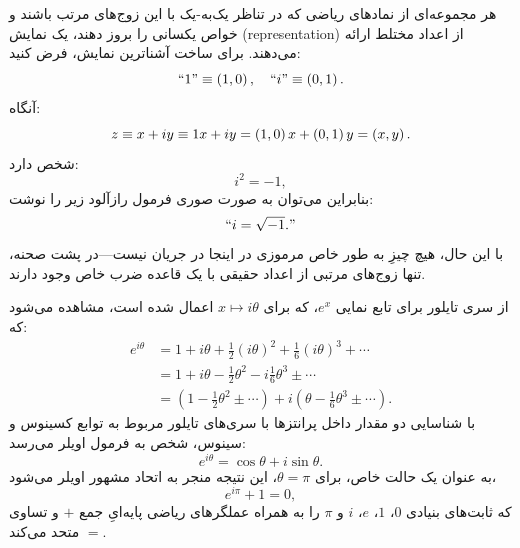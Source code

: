 \documentclass{article}
\begin{document}
هر مجموعه‌ای از نمادهای ریاضی که در تناظر یک‌به-یک با این زوج‌های مرتب باشند و خواص یکسانی را بروز دهند، یک نمایش (representation) از اعداد مختلط ارائه می‌دهند. برای ساخت آشناترین نمایش، فرض کنید:
\begin{equation}
``1"\equiv\left(1,0\right),\quad``i"\equiv\left(0,1\right).\label{eq:Def1AndiForSimpleRepresentationComplexNumbers}
\end{equation}
 آنگاه:
\begin{equation}
z\equiv x+iy\equiv1x+iy=\left(1,0\right)x+\left(0,1\right)y=\left(x,y\right).\label{eq:DefGeneralComplexNumberFromOrderedPairs}
\end{equation}
 شخص دارد:
\begin{equation}
i^{2}=-1,\label{eq:iSquaredEqNegOne}
\end{equation}
 بنابراین می‌توان به صورت صوری فرمول رازآلود زیر را نوشت:
\begin{equation}
``i=\sqrt{-1}."\label{eq:iEqSqrtNegOne}
\end{equation}
 با این حال، هیچ چیزِ به طور خاص مرموزی در اینجا در جریان نیست—در پشت صحنه، تنها زوج‌های مرتبی از اعداد حقیقی با یک قاعده ضرب خاص وجود دارند.

از سری تایلور برای تابع نمایی $e^{x}$، که برای $x\mapsto i\theta$ اعمال شده است، مشاهده می‌شود که:
\begin{align*}
e^{i\theta} & =1+i\theta+\frac{1}{2}\left(i\theta\right)^{2}+\frac{1}{6}\left(i\theta\right)^{3}+\cdots\\
 & =1+i\theta-\frac{1}{2}\theta^{2}-i\frac{1}{6}\theta^{3}\pm\cdots\\
 & =\left(1-\frac{1}{2}\theta^{2}\pm\cdots\right)+i\left(\theta-\frac{1}{6}\theta^{3}\pm\cdots\right).
\end{align*}
 با شناسایی دو مقدار داخل پرانتزها با سری‌های تایلور مربوط به توابع کسینوس و سینوس، شخص به فرمول اویلر می‌رسد:
\begin{equation}
e^{i\theta}=\cos\theta+i\sin\theta.\label{eq:EulerFormula}
\end{equation}
 به عنوان یک حالت خاص، برای $\theta=\pi$، این نتیجه منجر به اتحاد مشهور اویلر می‌شود،
\begin{equation}
e^{i\pi}+1=0,\label{eq:EulerIdentity}
\end{equation}
 که ثابت‌های بنیادی $0$، $1$، $e$، $i$ و $\pi$ را به همراه عملگرهای ریاضی پایه‌ایِ جمع $+$ و تساوی $=$ متحد می‌کند.
\end{document}

